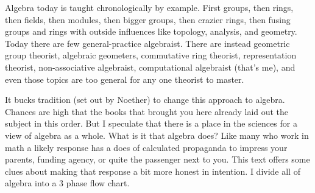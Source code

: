 
Algebra today is taught chronologically by example. 
First groups, then rings, then fields, then modules,
then bigger groups, then crazier rings, then fusing groups and rings with
outside influences like topology, analysis, and geometry.  Today there are
few general-practice algebraist.  There are instead geometric group theorist,
algebraic geometers, commutative ring theorist, representation theorist, non-associative algebraist,
computational algebraist (that's me), and even those topics are too general for any one
theorist to master. 

It bucks tradition (set out by Noether) to change this approach to algebra.
Chances are high that the books that brought you here already laid out the subject
in this order.
But I speculate that there is a place in the sciences for a view of algebra 
as a whole.  What is it that algebra does? Like many who work in math 
a likely response has a does of calculated propaganda to impress your 
parents, funding agency, or quite the passenger next to you. This text 
offers some clues about making that response a bit more honest in intention.
I divide all of algebra into a 3 phase flow chart.
\begin{center}
\end{center}
